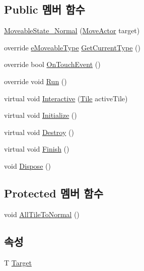 \subsection*{Public 멤버 함수}
\begin{DoxyCompactItemize}
\item 
\hyperlink{class_move_actor_1_1_moveable_state___normal_a812047f05ecd2769787b2358c05c5d9f}{Moveable\+State\+\_\+\+Normal} (\hyperlink{class_move_actor}{Move\+Actor} target)
\item 
override \hyperlink{_move_actor_8cs_a90215797ba850e199f3ef63d7c56f132}{e\+Moveable\+Type} \hyperlink{class_move_actor_1_1_moveable_state___normal_a97d1056e3447cae5b7c2e66c15b704fe}{Get\+Current\+Type} ()
\item 
override bool \hyperlink{class_move_actor_1_1_moveable_state___normal_a66db4e70d7493a733818f618984a9771}{On\+Touch\+Event} ()
\item 
override void \hyperlink{class_move_actor_1_1_moveable_state___normal_a687176bd566ec3493d38fb51d6f5de5f}{Run} ()
\item 
virtual void \hyperlink{class_move_actor_1_1_moveable_state_a2e7b5112230caf5048b95cbdc6b96e34}{Interactive} (\hyperlink{class_tile}{Tile} active\+Tile)
\item 
virtual void \hyperlink{class_m_c_n_1_1_state_a8eabaffe047e6dccd5c5d8aed7bf218a}{Initialize} ()
\item 
virtual void \hyperlink{class_m_c_n_1_1_state_a32af22a6a0a979d3b3a80225426aa839}{Destroy} ()
\item 
virtual void \hyperlink{class_m_c_n_1_1_state_a6de4f94b23916fcd05f589759da9ac3f}{Finish} ()
\item 
void \hyperlink{class_m_c_n_1_1_state_a6c53b2eda47e718ff469fd76a95cf02a}{Dispose} ()
\end{DoxyCompactItemize}
\subsection*{Protected 멤버 함수}
\begin{DoxyCompactItemize}
\item 
void \hyperlink{class_move_actor_1_1_moveable_state_a2da1a565b497b15a220f5ff494ec7a1e}{All\+Tile\+To\+Normal} ()
\end{DoxyCompactItemize}
\subsection*{속성}
\begin{DoxyCompactItemize}
\item 
T \hyperlink{class_m_c_n_1_1_state_a93ba2fd920292031bd6e65b1dc505cb3}{Target}
\end{DoxyCompactItemize}


